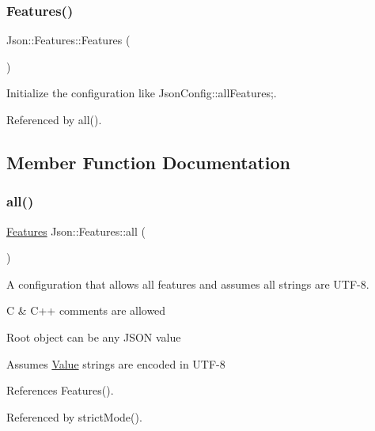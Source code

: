 \subsubsection{\texorpdfstring{Features()}{Features()}}
{\footnotesize\ttfamily Json\+::\+Features\+::\+Features (\begin{DoxyParamCaption}{ }\end{DoxyParamCaption})}



Initialize the configuration like Json\+Config\+::all\+Features;. 



Referenced by all().



\subsection{Member Function Documentation}
\mbox{\label{classJson_1_1Features_a63894da6e2c100b38741fa933f3d33ae_a63894da6e2c100b38741fa933f3d33ae}} 
\subsubsection{\texorpdfstring{all()}{all()}}
{\footnotesize\ttfamily \hyperlink{classJson_1_1Features}{Features} Json\+::\+Features\+::all (\begin{DoxyParamCaption}{ }\end{DoxyParamCaption})\hspace{0.3cm}{\ttfamily [static]}}



A configuration that allows all features and assumes all strings are U\+T\+F-\/8. 


\begin{DoxyItemize}
\item C \& C++ comments are allowed
\item Root object can be any J\+S\+ON value
\item Assumes \hyperlink{classJson_1_1Value}{Value} strings are encoded in U\+T\+F-\/8 
\end{DoxyItemize}

References Features().



Referenced by strict\+Mode().

